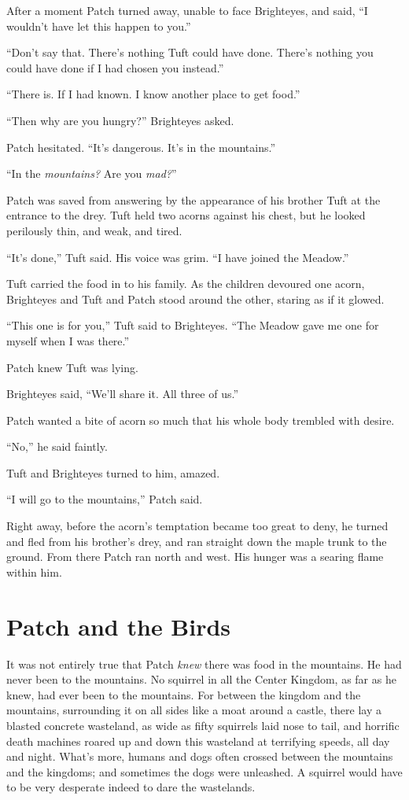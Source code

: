 \documentclass[ebook,oneside,openany,17pt]{memoir}
\renewcommand{\thechapter}{\Roman{chapter}}
\newcounter{sections}
\newcommand{\sections}[1]{%
  \section*{#1}
  \addtocounter{sections}{1}%
  \pdfbookmark[1]{#1}{section.\thechapter.\thesections}}
\begin{document}
After a moment Patch turned away, unable to face Brighteyes, and said,
“I wouldn’t have let this happen to you.”

“Don’t say that. There’s nothing Tuft could have done. There’s nothing
you could have done if I had chosen you instead.”

“There is. If I had known. I know another place to get food.”

“Then why are you hungry?” Brighteyes asked.

Patch hesitated. “It’s dangerous. It’s in the mountains.”

“In the \emph{mountains?} Are you \emph{mad?}”

Patch was saved from answering by the appearance of his brother Tuft
at the entrance to the drey. Tuft held two acorns against his chest,
but he looked perilously thin, and weak, and tired.

“It’s done,” Tuft said. His voice was grim. “I have joined the
Meadow.”

Tuft carried the food in to his family. As the children devoured one
acorn, Brighteyes and Tuft and Patch stood around the other, staring
as if it glowed.

“This one is for you,” Tuft said to Brighteyes. “The Meadow gave me
one for myself when I was there.”

Patch knew Tuft was lying.

Brighteyes said, “We’ll share it. All three of us.”

Patch wanted a bite of acorn so much that his whole body trembled with
desire.

“No,” he said faintly.

Tuft and Brighteyes turned to him, amazed.

“I will go to the mountains,” Patch said.

Right away, before the acorn’s temptation became too great to deny, he
turned and fled from his brother’s drey, and ran straight down the
maple trunk to the ground. From there Patch ran north and west. His
hunger was a searing flame within him.


\sections{Patch and the Birds}

It was not entirely true that Patch \emph{knew} there was food in
the mountains. He had never been to the mountains. No squirrel in all
the Center Kingdom, as far as he knew, had ever been to the
mountains. For between the kingdom and the mountains, surrounding it
on all sides like a moat around a castle, there lay a blasted concrete
wasteland, as wide as fifty squirrels laid nose to tail, and horrific
death machines roared up and down this wasteland at terrifying speeds,
all day and night. What’s more, humans and dogs often crossed between
the mountains and the kingdoms; and sometimes the dogs were
unleashed. A squirrel would have to be very desperate indeed to dare
the wastelands.
\end{document}
